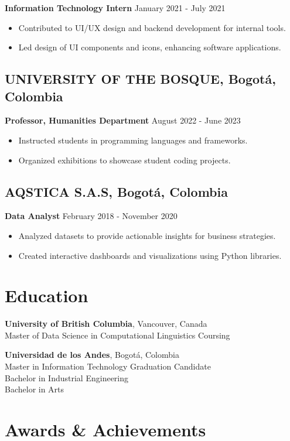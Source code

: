 \documentclass[11pt,a4paper]{article}
\begin{document}
\textbf{Information Technology Intern} \hfill January 2021 - July 2021
\begin{itemize}[noitemsep]
    \item Contributed to UI/UX design and backend development for internal tools.
    \item Led design of UI components and icons, enhancing software applications.
\end{itemize}

\subsection*{UNIVERSITY OF THE BOSQUE, Bogotá, Colombia}
\textbf{Professor, Humanities Department} \hfill August 2022 - June 2023
\begin{itemize}[noitemsep]
    \item Instructed students in programming languages and frameworks.
    \item Organized exhibitions to showcase student coding projects.
\end{itemize}

\subsection*{AQSTICA S.A.S, Bogotá, Colombia}
\textbf{Data Analyst} \hfill February 2018 - November 2020
\begin{itemize}[noitemsep]
    \item Analyzed datasets to provide actionable insights for business strategies.
    \item Created interactive dashboards and visualizations using Python libraries.
\end{itemize}

\section*{Education}

\textbf{University of British Columbia}, Vancouver, Canada \\
Master of Data Science in Computational Linguistics \hfill Coursing

\textbf{Universidad de los Andes}, Bogotá, Colombia \\
Master in Information Technology \hfill Graduation Candidate \\
Bachelor in Industrial Engineering \\
Bachelor in Arts

\section*{Awards \& Achievements}
\end{document}
